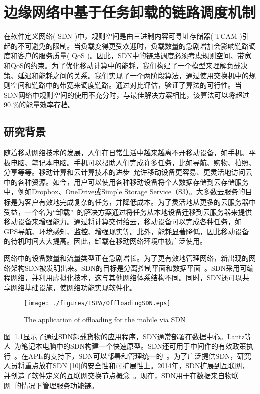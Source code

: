 \chapter{边缘网络中基于任务卸载的链路调度机制}

在软件定义网络( SDN )中，规则空间是由三进制内容可寻址存储器( TCAM )引起的不可避免的限制。当负载变得更受欢迎时，负载数量的急剧增加会影响链路调度和客户的服务质量( QoS )。因此，SDN中的链路调度必须考虑规则空间、带宽和QoS的约束。为了优化移动计算中的能耗，我们构建了一个模型来理解负载决策、延迟和能耗之间的关系。我们实现了一个两阶段算法，通过使用交换机中的规则空间和链路中的带宽来调度链路。通过对比评估，验证了算法的可行性。当SDN网络中规则空间的使用不充分时，与最佳解决方案相比，该算法可以将超过90 \%的能量效率存档。

\section{研究背景}

随着移动网络技术的发展，人们在日常生活中越来越离不开移动设备，如手机、平板电脑、笔记本电脑。手机可以帮助人们完成许多任务，比如导航、购物、拍照、分享等等。移动计算和云计算技术的进步~\cite{Lee:2013fj, Linthicum:2017vv}允许移动设备更容易、更灵活地访问云中的各种资源。如今，用户可以使用各种移动设备将个人数据存储到云存储服务中，例如Dropbox、OneDrive或Simple Storage Service（S3）。大多数云服务的目标是为客户有效地完成复杂的任务，并降低成本。为了灵活地从更多的云服务器中受益，一个名为“卸载”~\cite{Kumar:2013dq}的解决方案通过将任务从本地设备迁移到云服务器来提供移动设备来增强能力。通过将计算交付给云，移动设备可以完成各种任务，如GPS导航、环境感知、监控、增强现实等。此外，能耗显著降低，因此移动设备的待机时间大大提高。因此，卸载在移动网络环境中被广泛使用。

网络中的设备数量和流量类型正在急剧增长。为了更有效地管理网络，新出现的网络架构SDN被发明出来。SDN的目标是分离控制平面和数据平面~\cite{Committee:2012un}。SDN采用可编程网络，并利用虚拟化技术，这与其他网络体系结构不同。同时，SDN还可以共享网络基础设施，使网络功能实现软件化。

\begin{figure}[!h]
  \centering
  \texttt{[image: ./figures/ISPA/OffloadingSDN.eps]}
  \vspace{-1em}
  \caption{The application of offloading for the mobile via SDN}
  \vspace{-1em}
  \label{fig_OffloadingSDN}
\end{figure}

图~\ref{fig_OffloadingSDN}显示了通过SDN卸载货物的应用程序，SDN通常部署在数据中心。Lantz等人~\cite{Lantz:2010:NLR:1868447.1868466}为笔记本电脑中的SDN构建一个快速原型。SDN还可用于中间件的有效政策执行~\cite{Qazi:2013:SMP:2486001.2486022}。在APIs的支持下，SDN可以部署和管理统一的~\cite{Ferguson:2013:PNA:2486001.2486003}。为了广泛提供SDN，研究人员将重点放在SDN [10]的安全性和可扩展性上。2014年，SDN扩展到互联网，并创造了软件定义的互联网交换节点概念~\cite{Gupta:2014:SSD:2619239.2626300}。现在，SDN用于在数据来自物联网~\cite{Morabito:2017:FBS:3094405.3094413}的情况下管理服务功能链。

